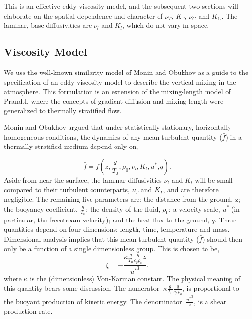 This is an effective eddy viscosity model, and the subsequent two
sections will elaborate on the spatial dependence and character of
$\nu_T$, $K_T$, $\nu_C$ and $K_C$. The laminar, base diffusivities 
are $\nu_l$ and $K_l$, which do not vary in space. 

\subsection{Viscosity Model}

We use the well-known similarity model of Monin and
Obukhov\cite{monin2007statistical,monin1954basic} as a guide to the
specification of an eddy viscosity model to describe the vertical mixing
in the atmosphere. This formulation is an extension of the mixing-length
model of Prandtl, where the concepts of gradient diffusion and mixing
length were generalized to thermally stratified flow.   

%
%

Monin and Obukhov argued that under statistically stationary, horizontally
homogeneous conditions, the dynamics of any mean turbulent quantity
($\bar f$) in a thermally stratified medium depend only on,  

\begin{equation}
\bar f = f(z,\frac{g}{T_0},\rho_0,\nu_l,K_l,u^*,q).
\end{equation}
Aside from near the surface, the laminar diffusivities $\nu_l$ 
and $K_l$ will be  
small compared to their turbulent counterparts, $\nu_T$ and $K_T$, and 
are therefore negligible. 
The remaining five parameters are: the distance from the ground, z; the
buoyancy coefficient, $\frac{g}{T_0}$; the density of the fluid,
$\rho_0$; a velocity scale, $u^*$ (in particular, the freestream
velocity); and the heat flux to the ground, $q$. %
%
% 
These quantities depend on four dimensions: length, time, temperature
and mass. Dimensional analysis implies that this mean turbulent quantity
($\bar f$) should then only be a function of a single dimensionless
group\cite{munson2012fundamentals}. This is chosen to be,
\begin{equation}
 \xi = -\frac{\kappa \frac{g}{T_0} \frac{q}{c_p \rho_0} z}{ {u^*}^3}.
\end{equation}
where $\kappa$ is the (dimensionless) Von-Karman constant. 
The physical meaning of this quantity bears some discussion.  
The numerator, $\kappa \frac{g}{T_0} \frac{q}{c_p \rho_0} $, is
proportional to the buoyant production of kinetic energy.  The
denominator, $\frac{{u^*}^3}{z}$, is a shear production rate. 

